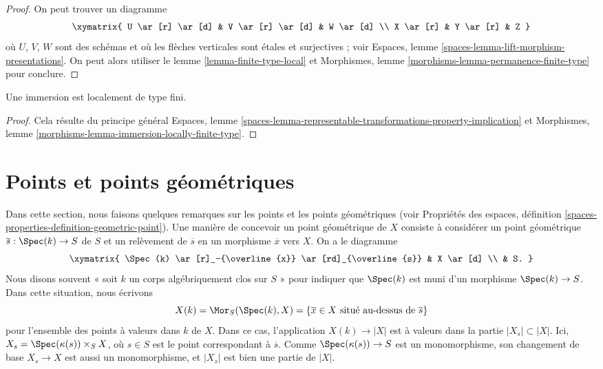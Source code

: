\begin{proof}
On peut trouver un diagramme
$$
\xymatrix{
U \ar[r] \ar[d] & V \ar[r] \ar[d] & W \ar[d] \\
X \ar[r] & Y \ar[r] & Z
}
$$
où $U$, $V$, $W$ sont des schémas et où les flèches verticales sont étales et surjectives ;
voir
Espaces, lemme \ref{spaces-lemma-lift-morphism-presentations}.
On peut alors utiliser le
lemme \ref{lemma-finite-type-local}
et
Morphismes, lemme \ref{morphisms-lemma-permanence-finite-type}
pour conclure.
\end{proof}

\begin{lemma}
\label{lemma-immersion-locally-finite-type}
Une immersion est localement de type fini.
\end{lemma}

\begin{proof}
Cela résulte du principe général
Espaces, lemme
\ref{spaces-lemma-representable-transformations-property-implication}
et
Morphismes, lemme \ref{morphisms-lemma-immersion-locally-finite-type}.
\end{proof}







\section{Points et points géométriques}
\label{section-points-fields}

\noindent
Dans cette section, nous faisons quelques remarques sur les points et les points géométriques (voir
Propriétés des espaces,
définition \ref{spaces-properties-definition-geometric-point}).
Une manière de concevoir un point géométrique de $X$ consiste à
considérer un point géométrique $\overline{s} : \Spec(k) \to S$ de $S$
et un relèvement de $\overline{s}$ en un morphisme $\overline{x}$ vers $X$.
On a le diagramme
$$
\xymatrix{
\Spec(k) \ar[r]_-{\overline{x}} \ar[rd]_{\overline{s}} & X \ar[d] \\
& S.
}
$$
Nous disons souvent « soit $k$ un corps algébriquement clos sur $S$ »
pour indiquer que $\Spec(k)$ est muni d'un morphisme
$\Spec(k) \to S$. Dans cette situation, nous écrivons
$$
X(k) = \Mor_S(\Spec(k), X) =
\{\overline{x} \in X\text{ situé au-dessus de }\overline{s}\}
$$
pour l'ensemble des points à valeurs dans $k$ de $X$. Dans ce cas, l'application
$X(k) \to |X|$ est à valeurs dans la partie $|X_s| \subset |X|$.
Ici, $X_s = \Spec(\kappa(s)) \times_S X$, où $s \in S$
est le point correspondant à $\overline{s}$. Comme
$\Spec(\kappa(s)) \to S$ est un monomorphisme, son changement de base
$X_s \to X$ est aussi un monomorphisme, et $|X_s|$ est bien une partie de $|X|$.

